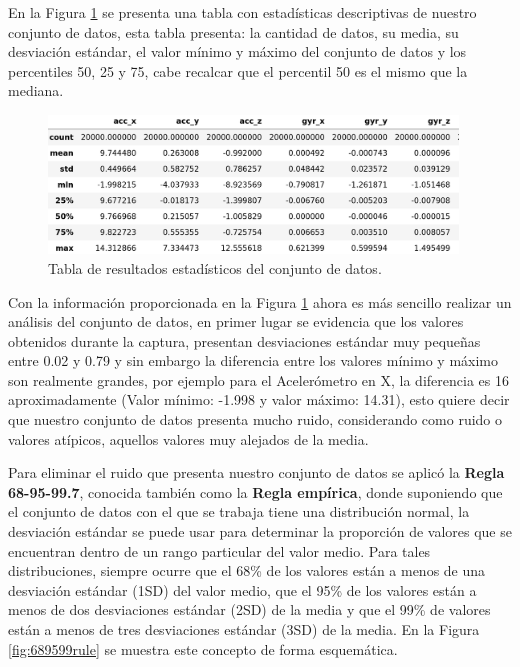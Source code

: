 \vspace{5mm} %

En la Figura \ref{tab: est} se presenta una tabla con estad\'{i}sticas descriptivas de nuestro conjunto de datos, esta tabla presenta: la cantidad de datos, su media, su desviaci\'{o}n est\'{a}ndar, el valor m\'{i}nimo y m\'{a}ximo del conjunto de datos y los percentiles 50, 25 y 75, cabe recalcar que el percentil 50 es el mismo que la mediana.

\begin{figure}[h!]
  \begin{center}	\includegraphics[width=0.97\textwidth]{imagenes/Cap3/describe_data}
  \caption{Tabla de resultados estad\'{i}sticos del conjunto de datos.}
  \label{tab: est}
  \end{center}
\end{figure}

\vspace{5mm} %

Con la informaci\'{o}n proporcionada en la Figura \ref{tab: est} ahora es m\'{a}s sencillo realizar un an\'{a}lisis del conjunto de datos, en primer lugar se evidencia que los valores obtenidos durante la captura, presentan desviaciones est\'{a}ndar muy peque\~{n}as entre 0.02 y 0.79 y sin embargo la diferencia entre los valores m\'{i}nimo y m\'{a}ximo son realmente grandes, por ejemplo para el Aceler\'{o}metro en X, la diferencia es 16 aproximadamente (Valor m\'{i}nimo: -1.998 y valor m\'{a}ximo: 14.31), esto quiere decir que nuestro conjunto de datos presenta mucho ruido, considerando como ruido o valores at\'{i}picos, aquellos valores muy alejados de la media. 

\vspace{5mm} %

Para eliminar el ruido que presenta nuestro conjunto de datos se aplic\'{o} la \textbf{Regla 68-95-99.7}, conocida tambi\'{e}n como la \textbf{Regla emp\'{i}rica}, donde suponiendo que el conjunto de datos con el que se trabaja tiene una distribuci\'{o}n normal, la desviaci\'{o}n est\'{a}ndar se puede usar para determinar la proporci\'{o}n de valores que se encuentran dentro de un rango particular del valor medio. Para tales distribuciones, siempre ocurre que el 68\% de los valores est\'{a}n a menos de una desviaci\'{o}n est\'{a}ndar (1SD) del valor medio, que el 95\% de los valores est\'{a}n a menos de dos desviaciones est\'{a}ndar (2SD) de la media y que el 99\% de valores est\'{a}n a menos de tres desviaciones est\'{a}ndar (3SD) de la media. En la Figura \ref{fig:689599rule} se muestra este concepto de forma esquem\'{a}tica.

